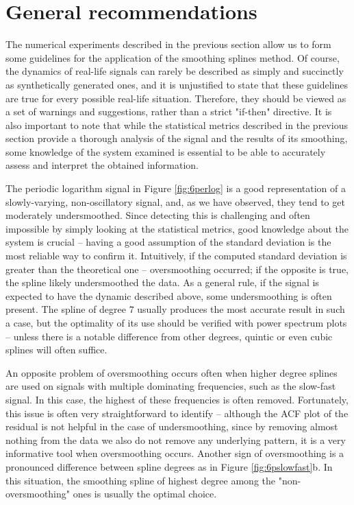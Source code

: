 \documentclass[11pt,leqno]{book}
\theoremstyle{definition}
\theoremstyle{plain}
\theoremstyle{definition}
\begin{document}
{\section{General recommendations}
The numerical experiments described in the previous section allow us to form some guidelines for the application of the smoothing splines method. Of course, the dynamics of real-life signals can rarely be described as simply and succinctly as synthetically generated ones, and it is unjustified to state that these guidelines are true for every possible real-life situation. Therefore, they should be viewed as a set of warnings and suggestions, rather than a strict "if-then" directive. It is also important to note that while the statistical metrics described in the previous section provide a thorough analysis of the signal and the results of its smoothing, some knowledge of the system examined is essential to be able to accurately assess and interpret the obtained information.

The periodic logarithm signal in Figure \ref{fig:6perlog} is a good representation of a slowly-varying, non-oscillatory signal, and, as we have observed, they tend to get moderately undersmoothed. Since detecting this is challenging and often impossible by simply looking at the statistical metrics, good knowledge about the system is crucial -- having a good assumption of the standard deviation is the most reliable way to confirm it. Intuitively, if the computed standard deviation is greater than the theoretical one -- oversmoothing occurred; if the opposite is true, the spline likely undersmoothed the data. As a general rule, if the signal is expected to have the dynamic described above, some undersmoothing is often present. The spline of degree $7$ usually produces the most accurate result in such a case, but the optimality of its use should be verified with power spectrum plots -- unless there is a notable difference from other degrees, quintic or even cubic splines will often suffice.

An opposite problem of oversmoothing occurs often when higher degree splines are used on signals with multiple dominating frequencies, such as the slow-fast signal. In this case, the highest of these frequencies is often removed. Fortunately, this issue is often very straightforward to identify -- although the ACF plot of the residual is not helpful in the case of undersmoothing, since by removing almost nothing from the data we also do not remove any underlying pattern, it is a very informative tool when oversmoothing occurs. Another sign of oversmoothing is a pronounced difference between spline degrees as in Figure \ref{fig:6pslowfast}b. In this situation, the smoothing spline of highest degree among the "non-oversmoothing" ones is usually the optimal choice.

}
\end{document}
